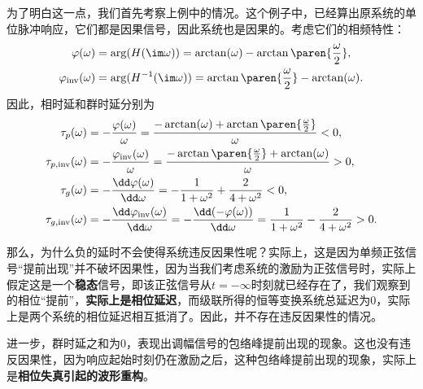 为了明白这一点，我们首先考察上例中的情况。这个例子中，已经算出原系统的单位脉冲响应，它们都是因果信号，因此系统也是因果的。考虑它们的相频特性：
\begin{align}
    \varphi(\omega)&=\arg(H(\im\omega))=\arctan(\omega)-\arctan\paren{\frac{\omega}{2}},\\
    \varphi_{\text{inv}}(\omega)&=\arg(H^{-1}(\im\omega))=\arctan\paren{\frac{\omega}{2}}-\arctan(\omega).
\end{align}
因此，相时延和群时延分别为
\begin{align}
    \tau_p(\omega)&=-\frac{\varphi(\omega)}{\omega}=\frac{-\arctan(\omega)+\arctan\paren{\frac{\omega}{2}}}{\omega}<0,\\
    \tau_{p,\text{inv}}(\omega)&=-\frac{\varphi_{\text{inv}}(\omega)}{\omega}=\frac{-\arctan\paren{\frac{\omega}{2}}+\arctan(\omega)}{\omega}>0,\\
    \tau_g(\omega)&=-\frac{\dd\varphi(\omega)}{\dd\omega}=-\frac{1}{1+\omega^2}+\frac{2}{4+\omega^2}<0,\\
    \tau_{g,\text{inv}}(\omega)&=-\frac{\dd\varphi_{\text{inv}}(\omega)}{\dd\omega}=-\frac{\dd(-\varphi(\omega))}{\dd\omega}=\frac{1}{1+\omega^2}-\frac{2}{4+\omega^2}>0.
\end{align}

那么，为什么负的延时不会使得系统违反因果性呢？实际上，这是因为单频正弦信号“提前出现”并不破坏因果性，因为当我们考虑系统的激励为正弦信号时，实际上假定这是一个\textbf{稳态}信号，即该正弦信号从$t=-\infty$时刻就已经存在了，我们观察到的相位“提前”，\textbf{实际上是相位延迟}，而级联所得的恒等变换系统总延迟为$0$，实际上是两个系统的相位延迟相互抵消了。因此，并不存在违反因果性的情况。

进一步，群时延之和为$0$，表现出调幅信号的包络峰提前出现的现象。这也没有违反因果性，因为响应起始时刻仍在激励之后，这种包络峰提前出现的现象，实际上是\textbf{相位失真引起的波形重构}。

